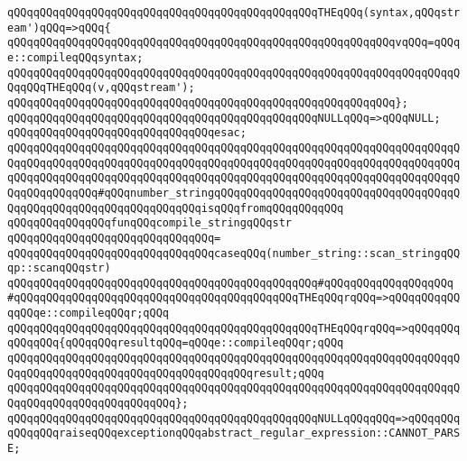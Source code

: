\verb|qQQqqQQqqQQqqQQqqQQqqQQqqQQqqQQqqQQqqQQqqQQqqQQqTHEqQQq(syntax,qQQqstream')qQQq=>qQQq{|\newline
\verb|qQQqqQQqqQQqqQQqqQQqqQQqqQQqqQQqqQQqqQQqqQQqqQQqqQQqqQQqqQQqvqQQq=qQQqe::compileqQQqsyntax;|\newline
\newline
\verb|qQQqqQQqqQQqqQQqqQQqqQQqqQQqqQQqqQQqqQQqqQQqqQQqqQQqqQQqqQQqqQQqqQQqqQQqqQQqTHEqQQq(v,qQQqstream');|\newline
\verb|qQQqqQQqqQQqqQQqqQQqqQQqqQQqqQQqqQQqqQQqqQQqqQQqqQQqqQQqqQQq};|\newline
\newline
\verb|qQQqqQQqqQQqqQQqqQQqqQQqqQQqqQQqqQQqqQQqqQQqqQQqNULLqQQq=>qQQqNULL;|\newline
\verb|qQQqqQQqqQQqqQQqqQQqqQQqqQQqqQQqesac;|\newline
\newline
\verb|qQQqqQQqqQQqqQQqqQQqqQQqqQQqqQQqqQQqqQQqqQQqqQQqqQQqqQQqqQQqqQQqqQQqqQQqqQQqqQQqqQQqqQQqqQQqqQQqqQQqqQQqqQQqqQQqqQQqqQQqqQQqqQQqqQQqqQQqqQQqqQQqqQQqqQQqqQQqqQQqqQQqqQQqqQQqqQQqqQQqqQQqqQQqqQQqqQQqqQQqqQQqqQQqqQQqqQQqqQQqqQQq#qQQqnumber_stringqQQqqQQqqQQqqQQqqQQqqQQqqQQqqQQqqQQqqQQqqQQqqQQqqQQqqQQqqQQqqQQqqQQqisqQQqfromqQQqqQQqqQQq|\newline
\verb|qQQqqQQqqQQqqQQqfunqQQqcompile_stringqQQqstr|\newline
\verb|qQQqqQQqqQQqqQQqqQQqqQQqqQQqqQQq=|\newline
\verb|qQQqqQQqqQQqqQQqqQQqqQQqqQQqqQQqcaseqQQq(number_string::scan_stringqQQqp::scanqQQqstr)|\newline
\verb|qQQqqQQqqQQqqQQqqQQqqQQqqQQqqQQqqQQqqQQqqQQqqQQq#qQQqqQQqqQQqqQQqqQQq|\newline
\verb|#qQQqqQQqqQQqqQQqqQQqqQQqqQQqqQQqqQQqqQQqqQQqTHEqQQqrqQQq=>qQQqqQQqqQQqqQQqe::compileqQQqr;qQQq|\newline
\newline
\verb|qQQqqQQqqQQqqQQqqQQqqQQqqQQqqQQqqQQqqQQqqQQqqQQqTHEqQQqrqQQq=>qQQqqQQqqQQqqQQq{qQQqqQQqresultqQQq=qQQqe::compileqQQqr;qQQq|\newline
\verb|qQQqqQQqqQQqqQQqqQQqqQQqqQQqqQQqqQQqqQQqqQQqqQQqqQQqqQQqqQQqqQQqqQQqqQQqqQQqqQQqqQQqqQQqqQQqqQQqqQQqqQQqqQQqresult;qQQq|\newline
\verb|qQQqqQQqqQQqqQQqqQQqqQQqqQQqqQQqqQQqqQQqqQQqqQQqqQQqqQQqqQQqqQQqqQQqqQQqqQQqqQQqqQQqqQQqqQQqqQQq};|\newline
\verb|qQQqqQQqqQQqqQQqqQQqqQQqqQQqqQQqqQQqqQQqqQQqqQQqNULLqQQqqQQq=>qQQqqQQqqQQqqQQqraiseqQQqexceptionqQQqabstract_regular_expression::CANNOT_PARSE;|\newline
